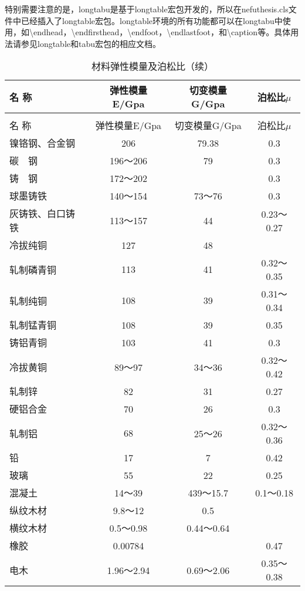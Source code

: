 特别需要注意的是，longtabu是基于longtable宏包开发的，所以在nefuthesis.cls文件中已经插入了longtable宏包。longtable环境的所有功能都可以在longtabu中使用，如\textbackslash endhead，\textbackslash endfirsthead，\textbackslash endfoot，\textbackslash endlastfoot，和\textbackslash caption等。具体用法请参见longtable和tabu宏包的相应文档。
\begin{longtabu}{lccc}
	\caption{材料弹性模量及泊松比}\label{tab:tabu_test_3}\\
	\toprule
	名  称   & 弹性模量E/Gpa & 切变模量G/Gpa & 泊松比$\mu$ \\
	\midrule%
	\endfirsthead
	\caption{材料弹性模量及泊松比（续）}\\
	\toprule
	名  称   & 弹性模量E/Gpa & 切变模量G/Gpa & 泊松比$\mu$ \\
	\midrule%
	\endhead
	\bottomrule%
	\endfoot
	镍铬钢、合金钢 & 206    & 79.38  & 0.3 \\
	碳　钢    &  196～206 & 79     & 0.3 \\
	铸　钢    &  172～202 &        & 0.3 \\
	球墨铸铁   &  140～154 &  73～76 & 0.3 \\
	灰铸铁、白口铸铁 &  113～157 & 44     &  0.23～0.27 \\
	冷拔纯铜   & 127    & 48     &   \\
	轧制磷青铜  & 113    & 41     &  0.32～0.35 \\
	轧制纯铜   & 108    & 39     &  0.31～0.34 \\
	轧制锰青铜  & 108    & 39     & 0.35 \\
	铸铝青铜   & 103    & 41     & 0.3 \\
	冷拔黄铜   &  89～97 &  34～36 &  0.32～0.42 \\
	轧制锌    & 82     & 31     & 0.27 \\
	硬铝合金   & 70     & 26     & 0.3 \\
	轧制铝    & 68     &  25～26 &  0.32～0.36 \\
	铅      & 17     & 7      & 0.42 \\
	玻璃     & 55     & 22     & 0.25 \\
	混凝土    &  14～39 &  439～15.7 &  0.1～0.18 \\
	纵纹木材   &  9.8～12 & 0.5    &   \\
	横纹木材   &  0.5～0.98 &  0.44～0.64 &   \\
	橡胶     & 0.00784 &        & 0.47 \\
	电木     &  1.96～2.94 &  0.69～2.06 &  0.35～0.38 \\

\end{longtabu}
